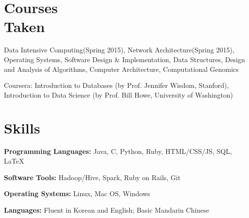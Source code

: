 \documentclass[11pt,margin,line]{cv}
\begin{document}
\begin{resume}
    \section{\mysidestyle Courses\\Taken}
    \begin{list3}
      \item Data Intensive Computing(Spring 2015), Network Architecture(Spring 2015), Operating Systems, Software Design \& Implementation, Data Structures, Design and Analysis of Algorithms, Computer Architecture, Computational Genomics
      \vspace{1mm}
      \item Coursera: Introduction to Databases (by Prof. Jennifer Wisdom, Stanford),  Introduction to Data Science (by Prof. Bill Howe, University of Washington)
    \end{list3}

    \section{\mysidestyle Skills}
    \begin{list3}
        \item\textbf{Programming Languages:} Java, C, Python, Ruby, HTML/CSS/JS, SQL, \LaTeX
        \item\textbf{Software Tools:}  Hadoop/Hive, Spark, Ruby on Rails, Git
        \item\textbf{Operating Systems:} Linux, Mac OS, Windows
        \item\textbf{Languages:} Fluent in Korean and English; Basic Mandarin Chinese
    \end{list3}

\end{resume}
\end{document}
